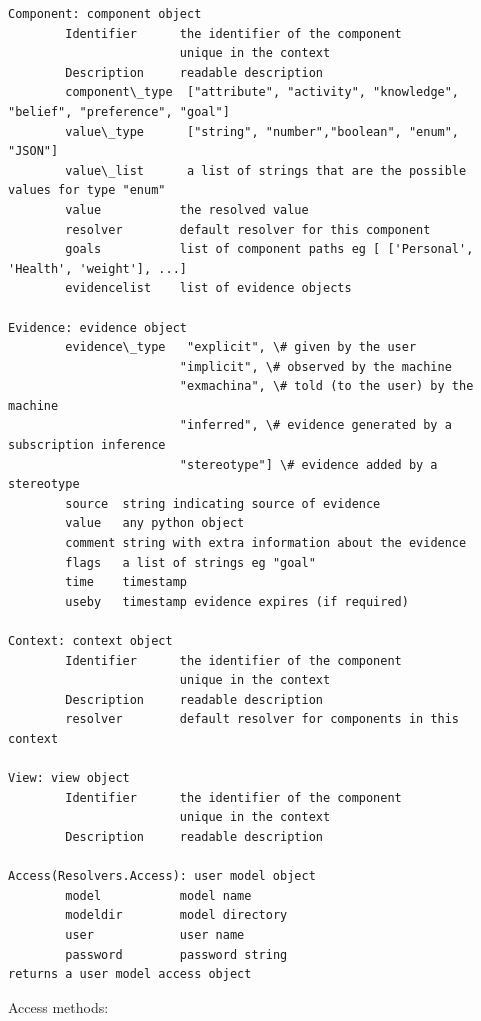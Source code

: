 \documentclass[letterpaper,10pt,english]{sphinxmanual}
\begin{document}
\begin{Verbatim}[commandchars=\\\{\}]
Component: component object
        Identifier      the identifier of the component
                        unique in the context
        Description     readable description
        component\_type  ["attribute", "activity", "knowledge", "belief", "preference", "goal"]
        value\_type      ["string", "number","boolean", "enum", "JSON"]
        value\_list      a list of strings that are the possible values for type "enum"
        value           the resolved value
        resolver        default resolver for this component
        goals           list of component paths eg [ ['Personal', 'Health', 'weight'], ...]
        evidencelist    list of evidence objects

Evidence: evidence object
        evidence\_type   "explicit", \# given by the user
                        "implicit", \# observed by the machine
                        "exmachina", \# told (to the user) by the machine
                        "inferred", \# evidence generated by a subscription inference
                        "stereotype"] \# evidence added by a stereotype
        source  string indicating source of evidence
        value   any python object
        comment string with extra information about the evidence
        flags   a list of strings eg "goal"
        time    timestamp
        useby   timestamp evidence expires (if required)

Context: context object
        Identifier      the identifier of the component
                        unique in the context
        Description     readable description
        resolver        default resolver for components in this context

View: view object
        Identifier      the identifier of the component
                        unique in the context
        Description     readable description

Access(Resolvers.Access): user model object
        model           model name
        modeldir        model directory
        user            user name
        password        password string
returns a user model access object
\end{Verbatim}

Access methods:
\end{document}
